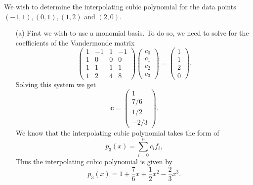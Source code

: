 \documentclass[12pt]{report}
\newcommand{\bld}[1]{{\mathbf{#1}}}
\begin{document}
\begin{solution}

    \noindent
    We wish to determine the interpolating cubic polynomial for the data points $(-1, 1), (0, 1), (1, 2)$ and $(2, 0)$.

    \begin{enumerate}
        \item [(a)] 
        First we wish to use a monomial basis. To do so, we need to solve for the coefficients of the Vandermonde matrix
        \[ 
            \begin{pmatrix}
                1 & -1 & 1 &-1\\
                1 & 0 & 0 & 0\\
                1 & 1 & 1 & 1\\
                1 & 2 & 4 & 8
            \end{pmatrix}\begin{pmatrix}
                c_0\\
                c_1\\
                c_2\\
                c_3
            \end{pmatrix} = \begin{pmatrix}
                1\\
                1\\
                2\\
                0
            \end{pmatrix}.
        \]
        Solving this system we get
        \[ 
            \bld{c} = \begin{pmatrix}
                1\\
                7/6\\
                1/2\\
                -2/3
            \end{pmatrix}.
        \]
        We know that the interpolating cubic polynomial takes the form of
        \[ 
            p_3(x) = \sum_{i=0}^{n}c_i f_i,
        \]
        Thus the interpolating cubic polynomial is given by
        \[ 
            p_3(x) = 1 + \frac{7}{6}x + \frac{1}{2}x^2 - \frac{2}{3}x^3.
        \]



\end{enumerate}
\end{solution}
\end{document}
